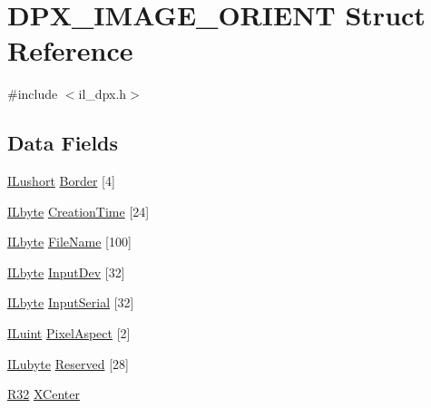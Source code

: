 \hypertarget{struct_d_p_x___i_m_a_g_e___o_r_i_e_n_t}{\section{D\-P\-X\-\_\-\-I\-M\-A\-G\-E\-\_\-\-O\-R\-I\-E\-N\-T Struct Reference}
\label{struct_d_p_x___i_m_a_g_e___o_r_i_e_n_t}
}


{\ttfamily \#include $<$il\-\_\-dpx.\-h$>$}

\subsection*{Data Fields}
\begin{DoxyCompactItemize}
\item 
\hyperlink{il_8h_af6287b43748354a7c4864da43ae56962}{I\-Lushort} \hyperlink{struct_d_p_x___i_m_a_g_e___o_r_i_e_n_t_a2de3c8ecf0ab1a99f837feb577af0e0b}{Border} \mbox{[}4\mbox{]}
\item 
\hyperlink{il_8h_a88e562dacd22f4efcf6f9d31b85d4f92}{I\-Lbyte} \hyperlink{struct_d_p_x___i_m_a_g_e___o_r_i_e_n_t_a20307c67b7245977e2568b8ca54dec0f}{Creation\-Time} \mbox{[}24\mbox{]}
\item 
\hyperlink{il_8h_a88e562dacd22f4efcf6f9d31b85d4f92}{I\-Lbyte} \hyperlink{struct_d_p_x___i_m_a_g_e___o_r_i_e_n_t_a3edd297e799271498ddf74fb64cbdb00}{File\-Name} \mbox{[}100\mbox{]}
\item 
\hyperlink{il_8h_a88e562dacd22f4efcf6f9d31b85d4f92}{I\-Lbyte} \hyperlink{struct_d_p_x___i_m_a_g_e___o_r_i_e_n_t_a74fe900d8518ed306247a1325ce7136c}{Input\-Dev} \mbox{[}32\mbox{]}
\item 
\hyperlink{il_8h_a88e562dacd22f4efcf6f9d31b85d4f92}{I\-Lbyte} \hyperlink{struct_d_p_x___i_m_a_g_e___o_r_i_e_n_t_a88b57b8e99fd3a1e07eadb485c197844}{Input\-Serial} \mbox{[}32\mbox{]}
\item 
\hyperlink{il_8h_ac6508d0e9c19e32f32e00d54b5b8cf30}{I\-Luint} \hyperlink{struct_d_p_x___i_m_a_g_e___o_r_i_e_n_t_a6f3b7cc6bda0c83fc52299b57f1f85a9}{Pixel\-Aspect} \mbox{[}2\mbox{]}
\item 
\hyperlink{il_8h_a8d2f04500100a86d1b00e98ab1b15a33}{I\-Lubyte} \hyperlink{struct_d_p_x___i_m_a_g_e___o_r_i_e_n_t_aa73f5c7b7ee3b2239cc9eaf0a52e2f3b}{Reserved} \mbox{[}28\mbox{]}
\item 
\hyperlink{struct_r32}{R32} \hyperlink{struct_d_p_x___i_m_a_g_e___o_r_i_e_n_t_a18b6a469b3bb628146f9070f95bfa85c}{X\-Center}
\item 

\end{DoxyCompactItemize}
